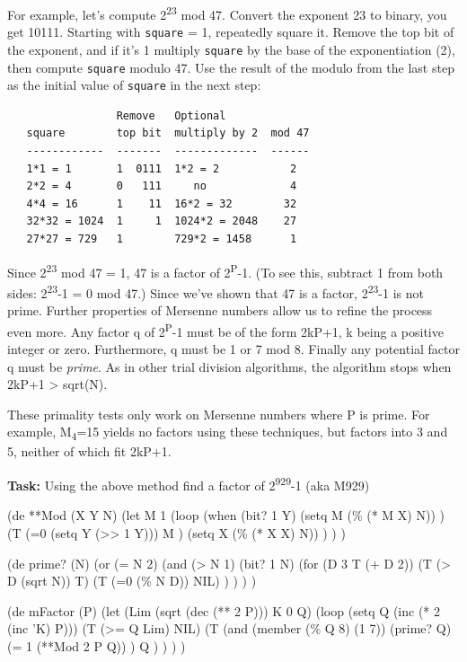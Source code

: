 For example, let's compute 2\textsuperscript{23} mod 47. Convert the
exponent 23 to binary, you get 10111. Starting with \texttt{square} = 1,
repeatedly square it. Remove the top bit of the exponent, and if it's 1
multiply \texttt{square} by the base of the exponentiation (2), then
compute \texttt{square} modulo 47. Use the result of the modulo from the
last step as the initial value of \texttt{square} in the next step:

\begin{verbatim}
                 Remove   Optional   
   square        top bit  multiply by 2  mod 47
   ------------  -------  -------------  ------
   1*1 = 1       1  0111  1*2 = 2           2
   2*2 = 4       0   111     no             4
   4*4 = 16      1    11  16*2 = 32        32
   32*32 = 1024  1     1  1024*2 = 2048    27
   27*27 = 729   1        729*2 = 1458      1
\end{verbatim}

Since 2\textsuperscript{23} mod 47 = 1, 47 is a factor of
2\textsuperscript{P}-1. (To see this, subtract 1 from both sides:
2\textsuperscript{23}-1 = 0 mod 47.) Since we've shown that 47 is a
factor, 2\textsuperscript{23}-1 is not prime. Further properties of
Mersenne numbers allow us to refine the process even more. Any factor
q of 2\textsuperscript{P}-1 must be of the form 2kP+1, k being a
positive integer or zero. Furthermore, q must be 1 or 7 mod 8. Finally
any potential factor q must be \emph{prime}. As in other trial
division algorithms, the algorithm stops when 2kP+1 \textgreater{}
sqrt(N).

These primality tests only work on Mersenne numbers where P is prime.
For example, M\textsubscript{4}=15 yields no factors using these
techniques, but factors into 3 and 5, neither of which fit 2kP+1.

\textbf{Task:} Using the above method find a factor of
2\textsuperscript{929}-1 (aka M929)


\begin{wideverbatim}

(de **Mod (X Y N)
   (let M 1
      (loop
         (when (bit? 1 Y)
            (setq M (\% (* M X) N)) )
         (T (=0 (setq Y (>> 1 Y)))
            M )
         (setq X (\% (* X X) N)) ) ) )

(de prime? (N)
   (or
      (= N 2)
      (and
         (> N 1)
         (bit? 1 N)
         (for (D 3  T  (+ D 2))
            (T (> D (sqrt N)) T)
            (T (=0 (\% N D)) NIL) ) ) ) )

(de mFactor (P)
   (let (Lim (sqrt (dec (** 2 P)))  K 0  Q)
      (loop
         (setq Q (inc (* 2 (inc 'K) P)))
         (T (>= Q Lim) NIL)
         (T
            (and
               (member (\% Q 8) (1 7))
               (prime? Q)
               (= 1 (**Mod 2 P Q)) )
            Q ) ) ) )

\end{wideverbatim}

